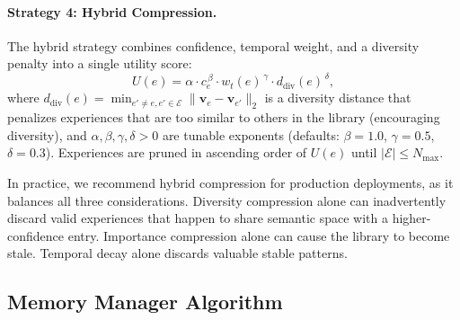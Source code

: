 \paragraph{Strategy 4: Hybrid Compression.}
The hybrid strategy combines confidence, temporal weight, and a diversity
penalty into a single utility score:
\begin{equation}
    U(e) = \alpha \cdot c_e^{\,\beta} \cdot w_t(e)^{\,\gamma} \cdot d_{\text{div}}(e)^{\,\delta},
    \label{eq:hybrid-utility}
\end{equation}
where $d_{\text{div}}(e) = \min_{e' \neq e, e' \in \mathcal{E}}\|\bm{v}_e - \bm{v}_{e'}\|_2$
is a diversity distance that penalizes experiences that are too similar to
others in the library (encouraging diversity), and $\alpha, \beta, \gamma, \delta > 0$
are tunable exponents (defaults: $\beta = 1.0$, $\gamma = 0.5$, $\delta = 0.3$).
Experiences are pruned in ascending order of $U(e)$ until $|\mathcal{E}| \leq N_{\max}$.

\begin{remark}
In practice, we recommend hybrid compression for production deployments, as
it balances all three considerations. Diversity compression alone can
inadvertently discard valid experiences that happen to share semantic space
with a higher-confidence entry. Importance compression alone can cause the
library to become stale. Temporal decay alone discards valuable stable patterns.
\end{remark}

\subsection{Memory Manager Algorithm}

